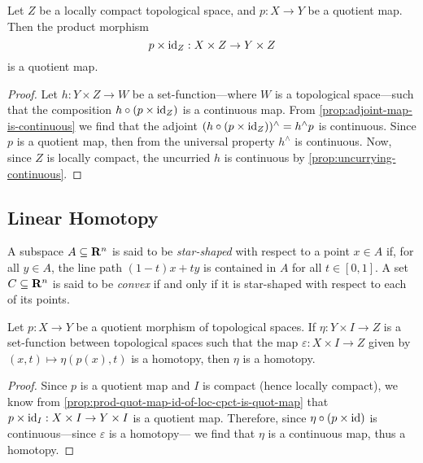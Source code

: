 \begin{proposition}
\label{prop:prod-quot-map-id-of-loc-cpct-is-quot-map}
Let \(Z\) be a locally compact topological space, and \(p: X \to Y\) be a
quotient map. Then the product morphism
\[
p \times \operatorname{id}_Z: X \times Z \to Y \times Z
\]
is a quotient map.
\end{proposition}

\begin{proof}
Let \(h: Y \times Z \to W\) be a set-function---where \(W\) is a topological
space---such that the composition \(h \circ (p \times \operatorname{id}_Z)\) is a continuous
map. From \cref{prop:adjoint-map-is-continuous} we find that the adjoint
\((h \circ (p \times \operatorname{id}_Z))^{\wedge} = h^{\wedge} p\) is continuous. Since
\(p\) is a quotient map, then from the universal property \(h^{\wedge}\) is
continuous. Now, since \(Z\) is locally compact, the uncurried \(h\) is
continuous by \cref{prop:uncurrying-continuous}.
\end{proof}

\subsection{Linear Homotopy}

\begin{definition}
\label{def:star-shaped-space}
A subspace \(A \subseteq \mathbf{R}^n\) is said to be \emph{star-shaped} with respect to
a point \(x \in A\) if, for all \(y \in A\), the line path \((1 - t)x + t y\) is
contained in \(A\) for all \(t \in [0, 1]\). A set \(C \subseteq \mathbf{R}^n\) is said
to be \emph{convex} if and only if it is star-shaped with respect to each of its
points.
\end{definition}

\begin{proposition}
\label{prop:homotopy-from-quotient-map}
Let \(p: X \to Y\) be a quotient morphism of topological spaces. If
\(\eta: Y \times I \to Z\) is a set-function between topological spaces such
that the map \(\varepsilon: X \times I \to Z\) given by
\((x, t) \mapsto \eta(p(x), t)\) is a homotopy, then \(\eta\) is a homotopy.
\end{proposition}

\begin{proof}
Since \(p\) is a quotient map and \(I\) is compact (hence locally compact), we
know from \cref{prop:prod-quot-map-id-of-loc-cpct-is-quot-map} that \(p \times
\operatorname{id}_I: X \times I \to Y \times I\) is a quotient map. Therefore, since \(\eta
\circ (p \times \operatorname{id})\) is continuous---since \(\varepsilon\) is a homotopy--- we
find that \(\eta\) is a continuous map, thus a homotopy.
\end{proof}

